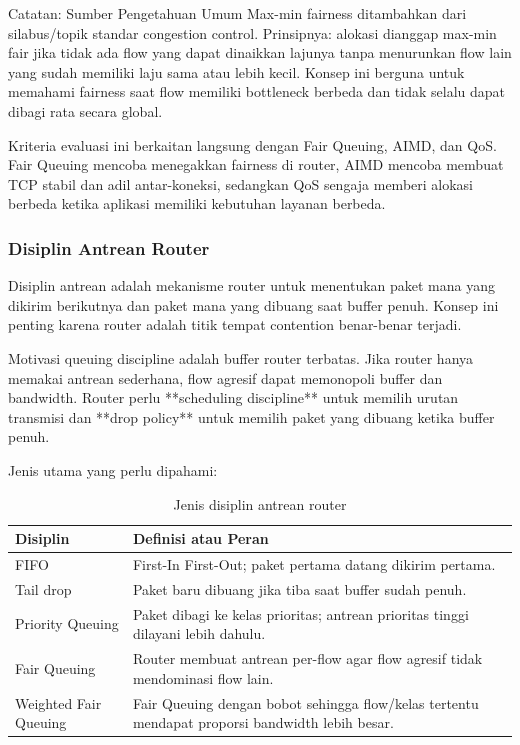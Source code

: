 \begin{cmt}{Catatan: Sumber Pengetahuan Umum}{}
Max-min fairness ditambahkan dari silabus/topik standar congestion control. Prinsipnya: alokasi dianggap max-min fair jika tidak ada flow yang dapat dinaikkan lajunya tanpa menurunkan flow lain yang sudah memiliki laju sama atau lebih kecil. Konsep ini berguna untuk memahami fairness saat flow memiliki bottleneck berbeda dan tidak selalu dapat dibagi rata secara global.
\end{cmt}

Kriteria evaluasi ini berkaitan langsung dengan Fair Queuing, AIMD, dan QoS. Fair Queuing mencoba menegakkan fairness di router, AIMD mencoba membuat TCP stabil dan adil antar-koneksi, sedangkan QoS sengaja memberi alokasi berbeda ketika aplikasi memiliki kebutuhan layanan berbeda.

\subsubsection{Disiplin Antrean Router}
\begin{jawab}
Disiplin antrean adalah mekanisme router untuk menentukan paket mana yang dikirim berikutnya dan paket mana yang dibuang saat buffer penuh. Konsep ini penting karena router adalah titik tempat contention benar-benar terjadi.
\end{jawab}

Motivasi queuing discipline adalah buffer router terbatas. Jika router hanya memakai antrean sederhana, flow agresif dapat memonopoli buffer dan bandwidth. Router perlu **scheduling discipline** untuk memilih urutan transmisi dan **drop policy** untuk memilih paket yang dibuang ketika buffer penuh.

Jenis utama yang perlu dipahami:
\begin{table}[H]
\centering
\begin{tabularx}{\textwidth}{|L{0.25\textwidth}|X|}
\hline
\textbf{Disiplin} & \textbf{Definisi atau Peran} \\
\hline
FIFO & First-In First-Out; paket pertama datang dikirim pertama. \\
\hline
Tail drop & Paket baru dibuang jika tiba saat buffer sudah penuh. \\
\hline
Priority Queuing & Paket dibagi ke kelas prioritas; antrean prioritas tinggi dilayani lebih dahulu. \\
\hline
Fair Queuing & Router membuat antrean per-flow agar flow agresif tidak mendominasi flow lain. \\
\hline
Weighted Fair Queuing & Fair Queuing dengan bobot sehingga flow/kelas tertentu mendapat proporsi bandwidth lebih besar. \\
\hline
\end{tabularx}
\caption{Jenis disiplin antrean router}
\label{tab:queuing-disciplines}
\end{table}

